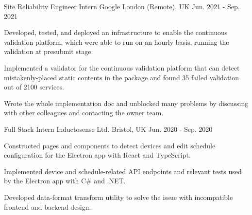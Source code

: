 

\begin{cventries}

  \cventry
    {Site Reliability Engineer Intern} %
    {Google} %
    {London (Remote), UK} %
    {Jun. 2021 - Sep. 2021} %
    {
      \begin{cvitems} %
        \item {Developed, tested, and deployed an infrastructure to enable the continuous validation platform, which were able to run on an hourly basis, running the validation at presubmit stage.}
        \item {Implemented a validator for the continuous validation platform that can detect mistakenly-placed static contents in the package and found 35 failed validation out of 2100 services.}
        \item {Wrote the whole implementation doc and unblocked many problems by discussing with other colleagues and contacting the owner team.}
      \end{cvitems}
    }

  \cventry
    {Full Stack Intern} %
    {Inductosense Ltd.} %
    {Bristol, UK} %
    {Jun. 2020 - Sep. 2020} %
    {
      \begin{cvitems} %
        \item {Constructed pages and components to detect devices and edit schedule configuration for the Electron app with React and TypeScript.}
        \item {Implemented device and schedule-related API endpoints and relevant tests used by the Electron app with C\# and .NET.}
        \item {Developed data-format transform utility to solve the issue with incompatible frontend and backend design.}
      \end{cvitems}
    }



\end{cventries}

